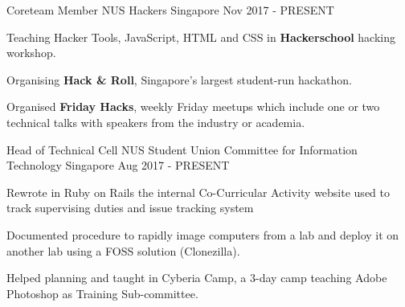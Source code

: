 

\begin{cventries}

  \cventry
  {Coreteam Member} %
  {NUS Hackers} %
  {Singapore} %
  {Nov 2017 - PRESENT} %
  {
    \begin{cvitems} %
      \item {Teaching Hacker Tools, JavaScript, HTML and CSS in \textbf{Hackerschool} hacking workshop.}
      \item {Organising \textbf{Hack \& Roll}, Singapore's largest student-run hackathon.}
      \item {Organised \textbf{Friday Hacks}, weekly Friday meetups which include one or two technical talks with speakers from the industry or academia.}
    \end{cvitems}
  }

  \cventry
  {Head of Technical Cell} %
  {NUS Student Union Committee for Information Technology} %
  {Singapore} %
  {Aug 2017 - PRESENT} %
  {
    \begin{cvitems} %
      \item {Rewrote in Ruby on Rails the internal Co-Curricular Activity website used to track supervising duties and issue tracking system}
      \item {Documented procedure to rapidly image computers from a lab and deploy it on another lab using a FOSS solution (Clonezilla).}
      \item {Helped planning and taught in Cyberia Camp, a 3-day camp teaching Adobe Photoshop as Training Sub-committee.}
    \end{cvitems}
  }

\end{cventries}
